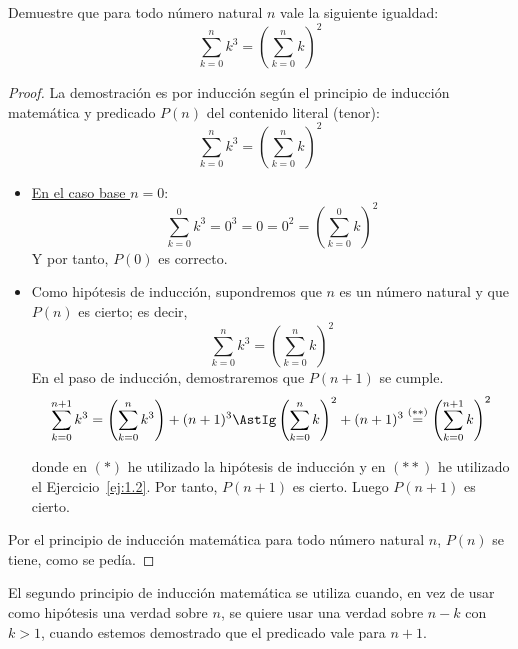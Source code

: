 \begin{ejercicio}
    Demuestre que para todo número natural $n$ vale la siguiente igualdad:
    $$\sum_{k=0}^n k^3 = \left(\sum_{k=0}^n k\right)^2$$
\begin{proof}
    La demostración es por inducción según el principio de inducción matemática y predicado $P(n)$ del contenido literal (tenor):
    $$\sum_{k=0}^n k^3 = \left(\sum_{k=0}^n k\right)^2$$
    \begin{itemize}
        \item \ul{En el caso base $n = 0$}:
        $$\sum_{k=0}^0 k^3 = 0^3 = 0 = 0^2 = \left(\sum_{k=0}^0 k\right)^2$$
        Y por tanto, $P(0)$ es correcto.
        
        \item Como hipótesis de inducción, supondremos que $n$ es un número natural y que $P(n)$ es cierto; es decir, 
        $$\sum_{k=0}^{n} k^3 = \left(\sum_{k=0}^n k\right)^2$$
        En el paso de inducción, demostraremos que $P(n+1)$ se cumple.
        $$\sum_{k=0}^{n+1} k^3 = \left(\sum_{k=0}^n k^3\right) + (n+1)^3 \AstIg \left(\sum_{k=0}^n k\right)^2 + (n+1)^3 \stackrel{(\ast\ast)}{=} \left(\sum_{k=0}^{n+1} k\right)^2  $$

        donde en $(\ast)$ he utilizado la hipótesis de inducción y en $(\ast\ast)$ he utilizado el Ejercicio~\ref{ej:1.2}. Por tanto, $P(n+1)$ es cierto.
        Luego $P(n+1)$ es cierto.
    \end{itemize}
    Por el principio de inducción matemática para todo número natural $n$, $P(n)$ se tiene, como se pedía.
\end{proof}
\end{ejercicio}

\begin{observacion}
    El segundo principio de inducción matemática se utiliza cuando, en vez de usar como hipótesis una verdad sobre $n$, se quiere usar una verdad sobre $n-k$ con $k >1$, cuando estemos demostrado que el predicado vale para $n+1$.
\end{observacion}

